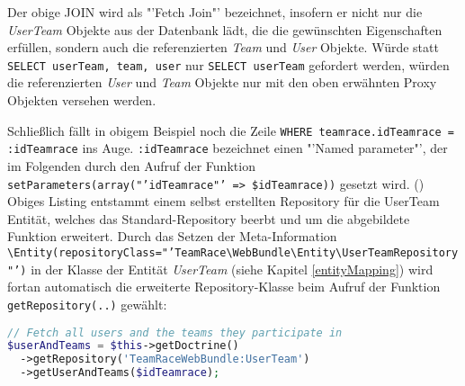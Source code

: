 \documentclass[12pt]{report}
\begin{document}
Der obige JOIN wird als "'Fetch Join"' bezeichnet, insofern er nicht nur die \emph{UserTeam} Objekte aus der Datenbank lädt, die die gewünschten Eigenschaften erfüllen, sondern auch die referenzierten \emph{Team} und \emph{User} Objekte. Würde statt \texttt{SELECT userTeam, team, user} nur \texttt{SELECT userTeam} gefordert werden, würden die referenzierten \emph{User} und \emph{Team} Objekte nur mit den oben erwähnten Proxy Objekten versehen werden.

Schließlich fällt in obigem Beispiel noch die Zeile \texttt{WHERE teamrace.idTeamrace = :idTeamrace} ins Auge. \texttt{:idTeamrace} bezeichnet einen "'Named parameter"', der im Folgenden durch den Aufruf der Funktion \texttt{setParameters(array("'idTeamrace"' => \$idTeamrace))} gesetzt wird. (\cite{Doctrine:DQL})\\

Obiges Listing entstammt einem selbst erstellten Repository für die UserTeam Entität, welches das Standard-Repository beerbt und um die abgebildete Funktion erweitert. Durch das Setzen der Meta-Information \\
\texttt{\@ORM\textbackslash Entity(repositoryClass="'TeamRace\textbackslash WebBundle\textbackslash Entity\textbackslash UserTeamRepository"')} in der Klasse der Entität \emph{UserTeam} (siehe Kapitel \ref{entityMapping}) wird fortan automatisch die erweiterte Repository-Klasse beim Aufruf der Funktion \texttt{getRepository(..)} gewählt:
\begin{lstlisting}[language=php, caption=Auszug aus \\src/TeamRace/WebBundle/Controller/TeamraceController.php, showstringspaces=false]
// Fetch all users and the teams they participate in 
$userAndTeams = $this->getDoctrine()
  ->getRepository('TeamRaceWebBundle:UserTeam')
  ->getUserAndTeams($idTeamrace);
\end{lstlisting}
\end{document}
